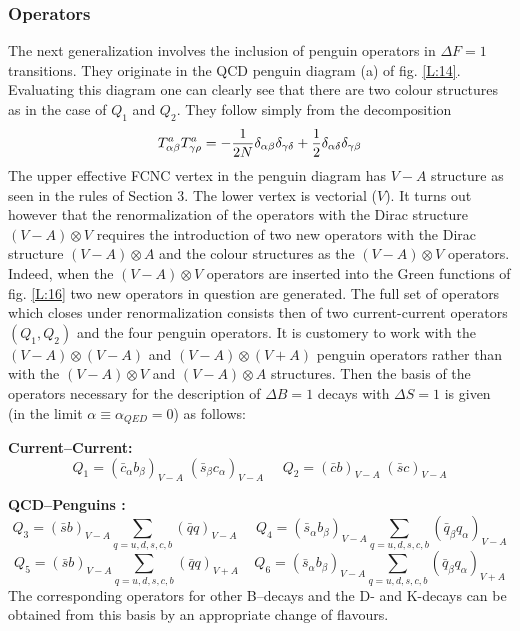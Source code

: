\documentclass[12pt]{article}
\begin{document}
\begin{itemize}
\begin{itemize}
\subsubsection{Operators}
The next generalization involves the inclusion of penguin operators
in $\Delta F=1$ transitions. They originate in the QCD penguin diagram 
(a) of fig. \ref{L:14}. Evaluating this diagram one can clearly see 
that there are two
colour structures as in the case of $Q_1$ and $Q_2$. They follow simply
from the decomposition
\begin{equation}\label{tata1}
T^a_{\alpha\beta}T^a_{\gamma\rho}
=-{1\over 2N}\delta_{\alpha\beta}\delta_{\gamma\delta}+{1\over 2}
\delta_{\alpha\delta}\delta_{\gamma\beta}
\end{equation}
The upper effective FCNC vertex in the penguin diagram has $V-A$
structure as seen in the rules of Section 3. The lower vertex is
vectorial ($V$). It turns out however that the renormalization
of the operators with the Dirac structure $(V-A)\otimes V$ requires
the introduction of two new operators with the Dirac structure 
$(V-A)\otimes A$ and the colour structures as the $(V-A)\otimes V$
operators. Indeed, when the $(V-A)\otimes V$ operators are inserted
into the Green functions of fig. \ref{L:16} two new operators in question
are generated. The full set of operators which closes under
renormalization consists then of two current-current operators
$(Q_1,Q_2)$ and the four penguin operators. It is customery to
work with the  $(V-A)\otimes(V-A)$ and  $(V-A)\otimes(V+A)$
penguin operators rather than with the
$(V-A)\otimes V$ and  $(V-A)\otimes A$ structures. Then the
basis of the operators  necessary for the description of
$\Delta B=1$ decays with $\Delta S=1$ 
is given (in the limit $\alpha\equiv\alpha_{QED}=0$) 
as follows:

{\bf Current--Current: }
\begin{equation}\label{O1} 
Q_1 = (\bar c_{\alpha} b_{\beta})_{V-A}\;(\bar s_{\beta} c_{\alpha})_{V-A}
~~~~~~Q_2 = (\bar c b)_{V-A}\;(\bar s c)_{V-A} 
\end{equation}

{\bf QCD--Penguins :}
\begin{equation}\label{O2}
Q_3 = (\bar s b)_{V-A} \sum_{q=u,d,s,c,b}(\bar qq)_{V-A}~~~~~~   
 Q_4 = (\bar s_{\alpha} b_{\beta})_{V-A}\sum_{q=u,d,s,c,b}(\bar q_{\beta} 
       q_{\alpha})_{V-A} 
\end{equation}
\begin{equation}\label{O3}
 Q_5 = (\bar s b)_{V-A} \sum_{q=u,d,s,c,b}(\bar qq)_{V+A}~~~~~  
 Q_6 = (\bar s_{\alpha} b_{\beta})_{V-A}\sum_{q=u,d,s,c,b}
       (\bar q_{\beta} q_{\alpha})_{V+A} 
\end{equation}
The corresponding operators for other B--decays and the D- and
K-decays can be obtained from this basis by an appropriate
change of flavours.


\end{itemize}
\end{itemize}
\end{document}
